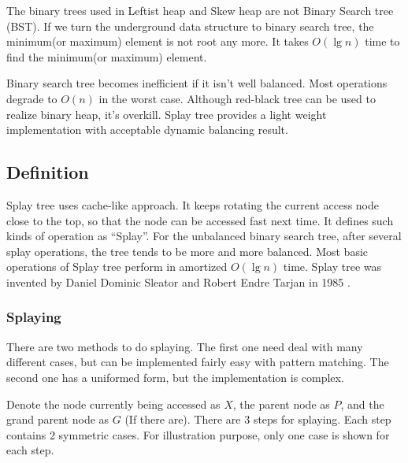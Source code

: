 \documentclass{article}
\begin{document}
The binary trees used in Leftist heap and Skew heap
are not Binary Search tree (BST). If we turn the underground
data structure to binary search tree, the minimum(or maximum)
element is not root any more. It takes $O(\lg n)$ time
to find the minimum(or maximum) element.

Binary search tree becomes inefficient if it isn't well
balanced. Most operations degrade to $O(n)$ in the worst case.
Although red-black tree can be used to realize
binary heap, it's overkill. Splay tree provides a light weight
implementation with acceptable dynamic balancing result.


\subsection{Definition}

Splay tree uses cache-like approach. It keeps rotating the current
access node close to the top, so that the node can be accessed fast
next time. It defines such kinds of operation as ``Splay''. For the
unbalanced binary search tree, after several splay operations, the
tree tends to be more and more balanced. Most basic operations of
Splay tree perform in amortized $O(\lg n)$ time. Splay tree was invented
by Daniel Dominic Sleator and Robert Endre Tarjan in 1985\cite{wiki-splay-tree}
\cite{self-adjusting-trees}.

\subsubsection{Splaying}

There are two methods to do splaying. The first one need deal
with many different cases, but can be implemented fairly easy with
pattern matching. The second one has a uniformed form, but the implementation
is complex.

Denote the node currently being accessed as $X$, the parent node as $P$,
and the grand parent node as $G$ (If there are).  There are 3 steps for
splaying. Each step contains 2 symmetric cases. For illustration
purpose, only one case is shown for each step.
\end{document}
